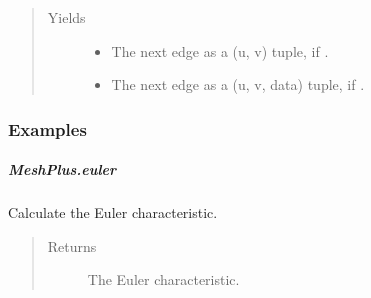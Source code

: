\documentclass[letterpaper,10pt,english]{sphinxmanual}
\begin{document}
\begin{fulllineitems}
\begin{fulllineitems}
\begin{quote}
\begin{description}
\item[{Yields}] \leavevmode\begin{itemize}
\item {} 
 \textendash{} The next edge as a (u, v) tuple, if .

\item {} 
 \textendash{} The next edge as a (u, v, data) tuple, if .

\end{itemize}

\end{description}\end{quote}
\subsubsection*{Examples}

\begin{sphinxVerbatim}[commandchars=\\\{\}]
\end{sphinxVerbatim}

\end{fulllineitems}



\subparagraph{MeshPlus.euler}
\label{\detokenize{api/generated/directional_clustering.mesh.MeshPlus.euler:meshplus-euler}}\label{\detokenize{api/generated/directional_clustering.mesh.MeshPlus.euler::doc}}

\begin{fulllineitems}
\label{\detokenize{api/generated/directional_clustering.mesh.MeshPlus.euler:directional_clustering.mesh.MeshPlus.euler}}
Calculate the Euler characteristic.
\begin{quote}\begin{description}
\item[{Returns}] \leavevmode
{} \textendash{} The Euler characteristic.

\end{description}\end{quote}

\end{fulllineitems}




\end{fulllineitems}
\end{document}
